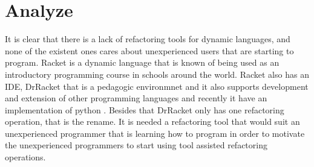 \section{Analyze}

It is clear that there is a lack of refactoring tools for dynamic languages, and none of the existent ones cares about unexperienced users that are starting to program.
Racket is a dynamic language that is known of being used as an introductory programming course in schools around the world. Racket also has an IDE, DrRacket that is a pedagogic environmnet \cite{drscheme_pegadogy} and it also supports development and extension of other programming languages \cite{tobin2011languages} and recently it have an implementation of python \cite{ramos2014implementation}.
Besides that DrRacket only has one refactoring operation, that is the rename.
It is needed a refactoring tool that would suit an unexperienced programmer that is learning how to program in order to motivate the unexperienced programmers to start using tool assisted refactoring operations.


